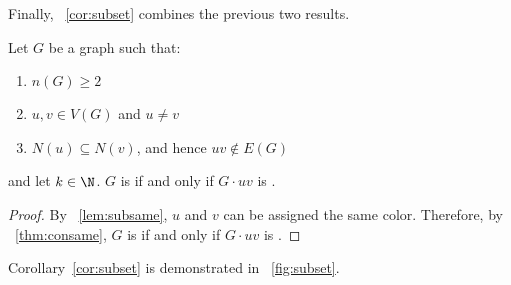 Finally, \corollaryname~\ref{cor:subset} combines the previous two results.

\begin{corollary}
  \label{cor:subset}
  Let \(G\) be a graph such that:
  \begin{enumerate}
  \item \(n(G)\ge 2\)
  \item \(u,v\in V(G)\) and \(u\ne v\)
  \item \(N(u)\subseteq N(v)\), and hence \(uv\notin E(G)\)
  \end{enumerate}
  and let \(k\in\N\).  \(G\) is  if and only if \(G\cdot uv\) is .
\end{corollary}

\begin{proof}
  By \lemmaname~\ref{lem:subsame}, \(u\) and \(v\) can be assigned the same color.  Therefore, by
  \theoremname~\ref{thm:consame}, \(G\) is  if and only if \(G\cdot uv\) is .
\end{proof}

Corollary~\ref{cor:subset} is demonstrated in \figurename~\ref{fig:subset}.

